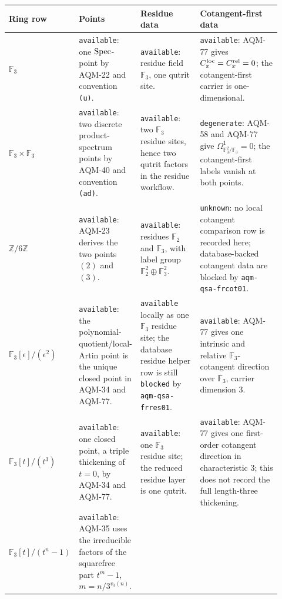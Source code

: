 \begin{center}
\scriptsize\setlength{\tabcolsep}{3pt}
\begin{tabular}{p{0.20\linewidth}p{0.20\linewidth}p{0.22\linewidth}p{0.30\linewidth}}
\toprule
Ring row & Points & Residue data & Cotangent-first data \\
\midrule
\(\mathbb F_3\) &
\texttt{available}: one \(\operatorname{Spec}\)-point by AQM-22 and convention
\texttt{(u)}. &
\texttt{available}: residue field \(\mathbb F_3\), one qutrit site. &
\texttt{available}: AQM-77 gives
\(C_x^{\rm loc}=C_x^{\rm rel}=0\); the cotangent-first carrier is
one-dimensional. \\
\addlinespace
\(\mathbb F_3\times\mathbb F_3\) &
\texttt{available}: two discrete product-spectrum points by AQM-40 and
convention \texttt{(ad)}. &
\texttt{available}: two \(\mathbb F_3\) residue sites, hence two qutrit
factors in the residue workflow. &
\texttt{degenerate}: AQM-58 and AQM-77 give
\(\Omega^1_{\mathbb F_3^2/\mathbb F_3}=0\); the cotangent-first labels vanish
at both points. \\
\addlinespace
\(\mathbb Z/6\mathbb Z\) &
\texttt{available}: AQM-23 derives the two points \((2)\) and \((3)\). &
\texttt{available}: residues \(\mathbb F_2\) and \(\mathbb F_3\), with label
group \(\mathbb F_2^2\oplus\mathbb F_3^2\). &
\texttt{unknown}: no local cotangent comparison row is recorded here;
database-backed cotangent data are blocked by \texttt{aqm-qsa-frcot01}. \\
\addlinespace
\(\mathbb F_3[\epsilon]/(\epsilon^2)\) &
\texttt{available}: the polynomial-quotient/local-Artin point is the unique
closed point in AQM-34 and AQM-77. &
\texttt{available} locally as one \(\mathbb F_3\) residue site; the database
residue helper row is still \texttt{blocked} by \texttt{aqm-qsa-frres01}. &
\texttt{available}: AQM-77 gives one intrinsic and relative
\(\mathbb F_3\)-cotangent direction over \(\mathbb F_3\), carrier dimension
\(3\). \\
\addlinespace
\(\mathbb F_3[t]/(t^3)\) &
\texttt{available}: one closed point, a triple thickening of \(t=0\), by
AQM-34 and AQM-77. &
\texttt{available}: one \(\mathbb F_3\) residue site; the reduced residue
layer is one qutrit. &
\texttt{available}: AQM-77 gives one first-order cotangent direction in
characteristic \(3\); this does not record the full length-three thickening. \\
\addlinespace
\(\mathbb F_3[t]/(t^n-1)\) &
\texttt{available}: AQM-35 uses the irreducible factors of the squarefree
part \(t^m-1\), \(m=n/3^{v_3(n)}\). &

\end{tabular}
\end{center}
